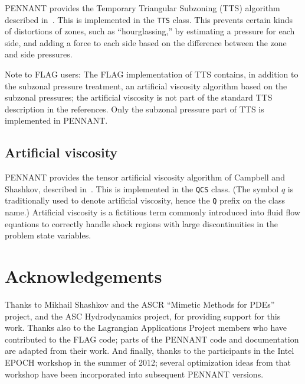 \documentclass[11pt,letterpaper]{article} %
\begin{document}
PENNANT provides the Temporary Triangular Subzoning (TTS) algorithm
described in~\cite{szp,tts}.  This is implemented in the {\tt TTS}
class.  This prevents certain kinds of distortions of zones, such as
``hourglassing,'' by estimating a pressure for each side, and adding
a force to each side based on the difference
between the zone and side pressures.

Note to FLAG users:  The FLAG implementation of TTS contains, in addition
to the subzonal pressure treatment, an artificial viscosity algorithm
based on the subzonal pressures; the artificial viscosity is not part of
the standard TTS description in the references.  Only the subzonal pressure
part of TTS is implemented in PENNANT.


\subsection{Artificial viscosity}

PENNANT provides the tensor artificial viscosity algorithm of Campbell and
Shashkov, described in~\cite{qcs}.  This is implemented in the {\tt QCS}
class.  (The symbol $q$ is traditionally used to denote artificial
viscosity, hence the {\tt Q} prefix on the class name.)
Artificial viscosity is a fictitious term commonly introduced into
fluid flow equations to correctly handle
shock regions with large discontinuities in
the problem state variables.


\section*{Acknowledgements}

Thanks to Mikhail Shashkov and the ASCR ``Mimetic Methods for PDEs''
project, and the ASC Hydrodynamics project, for providing support for
this work.
Thanks also to the Lagrangian Applications Project members who have
contributed to the FLAG code; parts of the PENNANT code and documentation
are adapted from their work.
And finally, thanks to the participants in the Intel EPOCH workshop
in the summer of 2012; several optimization ideas from that workshop
have been incorporated into subsequent PENNANT versions.
\end{document}

